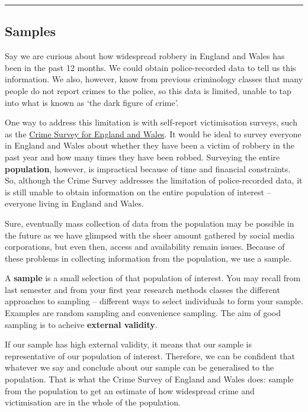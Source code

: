 \documentclass[
]{book}
\begin{document}
\begin{center}\rule{0.5\linewidth}{0.5pt}\end{center}

\hypertarget{samples}{%
\subsection{Samples}\label{samples}}

Say we are curious about how widespread robbery in England and Wales has been in the past 12 months. We could obtain police-recorded data to tell us this information. We also, however, know from previous criminology classes that many people do not report crimes to the police, so this data is limited, unable to tap into what is known as `the dark figure of crime'.

One way to address this limitation is with self-report victimisation surveys, such as the \href{https://www.crimesurvey.co.uk/en/index.html}{Crime Survey for England and Wales}. It would be ideal to survey everyone in England and Wales about whether they have been a victim of robbery in the past year and how many times they have been robbed. Surveying the entire \textbf{population}, however, is impractical because of time and financial constraints. So, although the Crime Survey addresses the limitation of police-recorded data, it is still unable to obtain information on the entire population of interest -- everyone living in England and Wales.

Sure, eventually mass collection of data from the population may be possible in the future as we have glimpsed with the sheer amount gathered by social media corporations, but even then, access and availability remain issues. Because of these problems in collecting information from the population, we use a sample.

A \textbf{sample} is a small selection of that population of interest. You may recall from last semester and from your first year research methods classes the different approaches to sampling -- different ways to select individuals to form your sample. Examples are random sampling and convenience sampling. The aim of good sampling is to acheive \textbf{external validity}.

If our sample has high external validity, it means that our sample is representative of our population of interest. Therefore, we can be confident that whatever we say and conclude about our sample can be generalised to the population. That is what the Crime Survey of England and Wales does: sample from the population to get an estimate of how widespread crime and victimisation are in the whole of the population.
\end{document}
